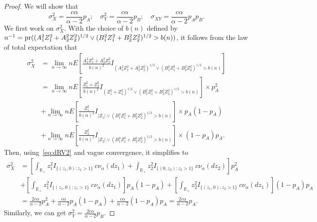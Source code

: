 \documentclass[lineno]{biometrika}
\newcommand \ag{\alpha}
\newcommand \sg{\sigma}
\newcommand\mbR{{\mathbb R}}
\newcommand\lb{\left [}
\newcommand\rb{\right ]}
\begin{document}
\begin{proof}

We will show that
\[
\sg_{X}^2 =\frac{c\ag}{\ag-2}p_A; \quad
\sg_{Y}^2 =\frac{c\ag}{\ag-2}p_B; \quad
\sg_{XY}=\frac{c\ag}{\ag-2}p_Ap_B.
\]
We first work on $\sg_{X}^2$. With the choice of $b(n)$ defined by $n^{-1} = {\rm pr}((A_1^2Z_1^2 + A_2^2Z_2^2)^{1/2} \vee (B_1^2Z_1^2 + B_2^2Z_2^2)^{1/2}  > b(n))$, it follows from the law of total expectation that
\begin{align*}
\sg_{X}^2
&= \lim_{n \to \infty} n E \lb  \frac{A_1^2Z_1^2 + A_2^2Z_2^2}{b(n)^2} I_{(A_1^2Z_1^2 + A_2^2Z_2^2)^{1/2} \vee (B_1^2Z_1^2 + B_2^2Z_2^2)^{1/2} > b(n)} \rb \\
&= \lim_{n \to \infty} n E \lb  \frac{Z_1^2 + Z_2^2}{b(n)^2} I_{(Z_1^2 + Z_2^2)^{1/2} \vee (B_1^2Z_1^2 + B_2^2Z_2^2)^{1/2} > b(n)} \rb \times p_A^2 \\
&+\lim_{n \to \infty} n E \lb  \frac{Z_1^2}{b(n)^2} I_{|Z_1| \vee (B_1^2Z_1^2 + B_2^2Z_2^2)^{1/2} > b(n)} \rb \times p_A(1-p_A) \\
& + \lim_{n \to \infty} n E \lb  \frac{Z_2^2}{b(n)^2} I_{|Z_2| \vee (B_1^2Z_1^2 + B_2^2Z_2^2)^{1/2} > b(n)} \rb \times (1-p_A)p_A.
\end{align*}
Then, using~\eqref{eq:dRV2} and vague convergence, it simplifies to
\begin{align*}
\sg_{X}^2
& = \lb \int_{\mbR_+}  z_1^2  I_{ \{(z_1, 0): z_1>1\} } \ c\nu_{\ag}(dz_1) + \int_{\mbR_+}  z_2^2 I_{ \{(0, z_2): z_2>1 \}} \ c\nu_{\ag}(dz_2) \rb p_A^2 \\
& + \lb \int_{\mbR_+}  z_1^2  I_{ \{(z_1, 0): z_1>1\} } \ c\nu_{\ag}(dz_1)  \rb p_A(1-p_A) + \lb \int_{\mbR_+}  z_2^2  I_{ \{(z_1, 0): z_2>1\} } \ c\nu_{\ag}(dz_1)  \rb (1-p_A)p_A\\
&= \frac{2c\ag}{\ag-2}p_A^2 + \frac{c\ag}{\ag-2}p_A(1-p_A) + \frac{c\ag}{\ag-2}(1-p_A)p_A= \frac{2c\ag}{\ag-2}p_A.
\end{align*}
Similarly, we can get $\sg_{Y}^2 = \frac{2c\ag}{\ag-2}p_B$.


\end{proof}
\end{document}
